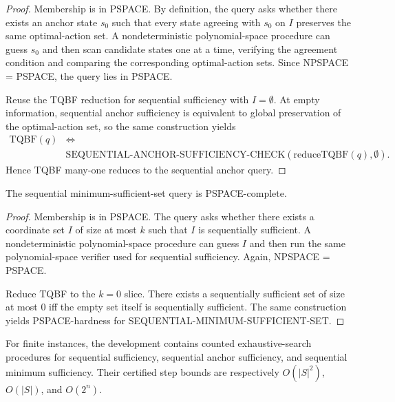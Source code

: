 \begin{proof}
Membership is in PSPACE. By definition, the query asks whether there exists an anchor state $s_0$ such that every state agreeing with $s_0$ on $I$ preserves the same optimal-action set. A nondeterministic polynomial-space procedure can guess $s_0$ and then scan candidate states one at a time, verifying the agreement condition and comparing the corresponding optimal-action sets. Since NPSPACE = PSPACE, the query lies in PSPACE.

Reuse the TQBF reduction for sequential sufficiency with $I=\emptyset$. At empty information, sequential anchor sufficiency is equivalent to global preservation of the optimal-action set, so the same construction yields
\[
\begin{aligned}
\mathrm{TQBF}(q) &\iff \\
&\mathrm{SEQUENTIAL\mbox{-}ANCHOR\mbox{-}SUFFICIENCY\mbox{-}CHECK}(\mathrm{reduceTQBF}(q),\emptyset).
\end{aligned}
\]
Hence TQBF many-one reduces to the sequential anchor query.
\end{proof}

\begin{theorem}\label{thm:sequential-minimum-hard}
The sequential minimum-sufficient-set query is PSPACE-complete.
\end{theorem}


\begin{proof}
Membership is in PSPACE. The query asks whether there exists a coordinate set $I$ of size at most $k$ such that $I$ is sequentially sufficient. A nondeterministic polynomial-space procedure can guess $I$ and then run the same polynomial-space verifier used for sequential sufficiency. Again, NPSPACE = PSPACE.

Reduce TQBF to the $k=0$ slice. There exists a sequentially sufficient set of size at most $0$ iff the empty set itself is sequentially sufficient. The same construction yields PSPACE-hardness for SEQUENTIAL-MINIMUM-SUFFICIENT-SET.
\end{proof}

\begin{proposition}\label{prop:sequential-explicit-search}
For finite instances, the development contains counted exhaustive-search procedures for sequential sufficiency, sequential anchor sufficiency, and sequential minimum sufficiency. Their certified step bounds are respectively $O(|S|^2)$, $O(|S|)$, and $O(2^n)$.
\end{proposition}


